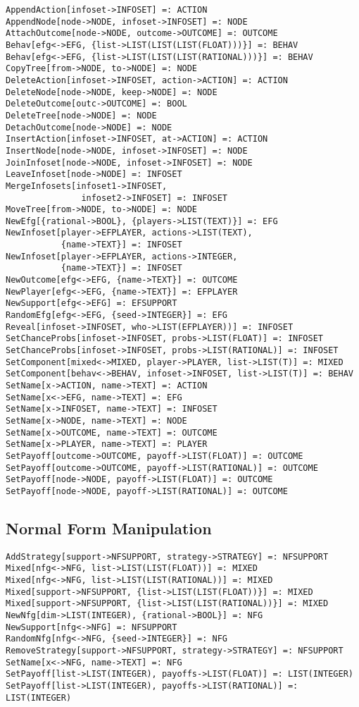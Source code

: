 \begin{verbatim}
AppendAction[infoset->INFOSET] =: ACTION
AppendNode[node->NODE, infoset->INFOSET] =: NODE
AttachOutcome[node->NODE, outcome->OUTCOME] =: OUTCOME
Behav[efg<->EFG, {list->LIST(LIST(LIST(FLOAT)))}] =: BEHAV
Behav[efg<->EFG, {list->LIST(LIST(LIST(RATIONAL)))}] =: BEHAV
CopyTree[from->NODE, to->NODE] =: NODE
DeleteAction[infoset->INFOSET, action->ACTION] =: ACTION
DeleteNode[node->NODE, keep->NODE] =: NODE
DeleteOutcome[outc->OUTCOME] =: BOOL
DeleteTree[node->NODE] =: NODE
DetachOutcome[node->NODE] =: NODE
InsertAction[infoset->INFOSET, at->ACTION] =: ACTION
InsertNode[node->NODE, infoset->INFOSET] =: NODE
JoinInfoset[node->NODE, infoset->INFOSET] =: NODE
LeaveInfoset[node->NODE] =: INFOSET
MergeInfosets[infoset1->INFOSET,
               infoset2->INFOSET] =: INFOSET
MoveTree[from->NODE, to->NODE] =: NODE
NewEfg[{rational->BOOL}, {players->LIST(TEXT)}] =: EFG
NewInfoset[player->EFPLAYER, actions->LIST(TEXT),
           {name->TEXT}] =: INFOSET
NewInfoset[player->EFPLAYER, actions->INTEGER,
           {name->TEXT}] =: INFOSET
NewOutcome[efg<->EFG, {name->TEXT}] =: OUTCOME
NewPlayer[efg<->EFG, {name->TEXT}] =: EFPLAYER 
NewSupport[efg<->EFG] =: EFSUPPORT
RandomEfg[efg<->EFG, {seed->INTEGER}] =: EFG
Reveal[infoset->INFOSET, who->LIST(EFPLAYER))] =: INFOSET
SetChanceProbs[infoset->INFOSET, probs->LIST(FLOAT)] =: INFOSET
SetChanceProbs[infoset->INFOSET, probs->LIST(RATIONAL)] =: INFOSET
SetComponent[mixed<->MIXED, player->PLAYER, list->LIST(T)] =: MIXED 
SetComponent[behav<->BEHAV, infoset->INFOSET, list->LIST(T)] =: BEHAV 
SetName[x->ACTION, name->TEXT] =: ACTION
SetName[x<->EFG, name->TEXT] =: EFG
SetName[x->INFOSET, name->TEXT] =: INFOSET
SetName[x->NODE, name->TEXT] =: NODE
SetName[x->OUTCOME, name->TEXT] =: OUTCOME
SetName[x->PLAYER, name->TEXT] =: PLAYER
SetPayoff[outcome->OUTCOME, payoff->LIST(FLOAT)] =: OUTCOME
SetPayoff[outcome->OUTCOME, payoff->LIST(RATIONAL)] =: OUTCOME
SetPayoff[node->NODE, payoff->LIST(FLOAT)] =: OUTCOME
SetPayoff[node->NODE, payoff->LIST(RATIONAL)] =: OUTCOME
\end{verbatim}

\subsection{Normal Form Manipulation}

\begin{verbatim}
AddStrategy[support->NFSUPPORT, strategy->STRATEGY] =: NFSUPPORT
Mixed[nfg<->NFG, list->LIST(LIST(FLOAT))] =: MIXED
Mixed[nfg<->NFG, list->LIST(LIST(RATIONAL))] =: MIXED
Mixed[support->NFSUPPORT, {list->LIST(LIST(FLOAT))}] =: MIXED
Mixed[support->NFSUPPORT, {list->LIST(LIST(RATIONAL))}] =: MIXED
NewNfg[dim->LIST(INTEGER), {rational->BOOL}] =: NFG
NewSupport[nfg<->NFG] =: NFSUPPORT
RandomNfg[nfg<->NFG, {seed->INTEGER}] =: NFG
RemoveStrategy[support->NFSUPPORT, strategy->STRATEGY] =: NFSUPPORT
SetName[x<->NFG, name->TEXT] =: NFG
SetPayoff[list->LIST(INTEGER), payoffs->LIST(FLOAT)] =: LIST(INTEGER)
SetPayoff[list->LIST(INTEGER), payoffs->LIST(RATIONAL)] =: LIST(INTEGER)
\end{verbatim}

